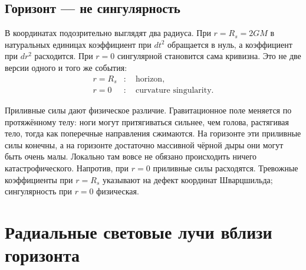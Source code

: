 
\subsection{Горизонт — не сингулярность}

В координатах подозрительно выглядят два радиуса. При \(r=R_s=2GM\) в натуральных единицах коэффициент при \(dt^2\) обращается в нуль, а коэффициент при \(dr^2\) расходится. При \(r=0\) сингулярной становится сама кривизна. Это не две версии одного и того же события:
\begin{equation}
\begin{aligned}
r=R_s &:\quad \text{horizon},\\
r=0 &:\quad \text{curvature singularity}.
\end{aligned}
\end{equation}

Приливные силы дают физическое различие. Гравитационное поле меняется по протяжённому телу: ноги могут притягиваться сильнее, чем голова, растягивая тело, тогда как поперечные направления сжимаются. На горизонте эти приливные силы конечны, а на горизонте достаточно массивной чёрной дыры они могут быть очень малы. Локально там вовсе не обязано происходить ничего катастрофического. Напротив, при \(r=0\) приливные силы расходятся. Тревожные коэффициенты при \(r=R_s\) указывают на дефект координат Шварцшильда; сингулярность при \(r=0\) физическая.


\section{Радиальные световые лучи вблизи горизонта}

